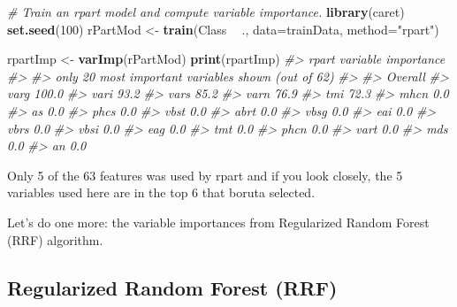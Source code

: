 \documentclass[]{book}
\newenvironment{Shaded}{\begin{snugshade}}{\end{snugshade}}
\newcommand{\CommentTok}[1]{\textcolor[rgb]{0.56,0.35,0.01}{\textit{#1}}}
\newcommand{\DataTypeTok}[1]{\textcolor[rgb]{0.13,0.29,0.53}{#1}}
\newcommand{\DecValTok}[1]{\textcolor[rgb]{0.00,0.00,0.81}{#1}}
\newcommand{\KeywordTok}[1]{\textcolor[rgb]{0.13,0.29,0.53}{\textbf{#1}}}
\newcommand{\NormalTok}[1]{#1}
\newcommand{\OperatorTok}[1]{\textcolor[rgb]{0.81,0.36,0.00}{\textbf{#1}}}
\newcommand{\StringTok}[1]{\textcolor[rgb]{0.31,0.60,0.02}{#1}}
\begin{document}
\begin{Shaded}
\begin{Highlighting}[]
\CommentTok{# Train an rpart model and compute variable importance.}
\KeywordTok{library}\NormalTok{(caret)}
\KeywordTok{set.seed}\NormalTok{(}\DecValTok{100}\NormalTok{)}
\NormalTok{rPartMod <-}\StringTok{ }\KeywordTok{train}\NormalTok{(Class }\OperatorTok{~}\StringTok{ }\NormalTok{., }
                  \DataTypeTok{data=}\NormalTok{trainData, }
                  \DataTypeTok{method=}\StringTok{"rpart"}\NormalTok{)}

\NormalTok{rpartImp <-}\StringTok{ }\KeywordTok{varImp}\NormalTok{(rPartMod)}
\KeywordTok{print}\NormalTok{(rpartImp)}
\CommentTok{#> rpart variable importance}
\CommentTok{#> }
\CommentTok{#>   only 20 most important variables shown (out of 62)}
\CommentTok{#> }
\CommentTok{#>      Overall}
\CommentTok{#> varg   100.0}
\CommentTok{#> vari    93.2}
\CommentTok{#> vars    85.2}
\CommentTok{#> varn    76.9}
\CommentTok{#> tmi     72.3}
\CommentTok{#> mhcn     0.0}
\CommentTok{#> as       0.0}
\CommentTok{#> phcs     0.0}
\CommentTok{#> vbst     0.0}
\CommentTok{#> abrt     0.0}
\CommentTok{#> vbsg     0.0}
\CommentTok{#> eai      0.0}
\CommentTok{#> vbrs     0.0}
\CommentTok{#> vbsi     0.0}
\CommentTok{#> eag      0.0}
\CommentTok{#> tmt      0.0}
\CommentTok{#> phcn     0.0}
\CommentTok{#> vart     0.0}
\CommentTok{#> mds      0.0}
\CommentTok{#> an       0.0}
\end{Highlighting}
\end{Shaded}

Only 5 of the 63 features was used by rpart and if you look closely, the 5 variables used here are in the top 6 that boruta selected.

Let's do one more: the variable importances from Regularized Random Forest (RRF) algorithm.

\hypertarget{regularized-random-forest-rrf}{%
\subsection{Regularized Random Forest (RRF)}\label{regularized-random-forest-rrf}}
\end{document}

